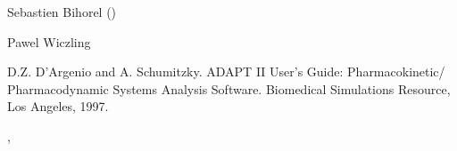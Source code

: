 \begin{Value}
\begin{description}
\begin{description}
\end{description}



\end{description}

\end{Value}
%
\begin{Author}\relax
Sebastien Bihorel ()

Pawel Wiczling
\end{Author}
%
\begin{References}\relax
D.Z. D'Argenio and A. Schumitzky. ADAPT II User's Guide: Pharmacokinetic/
Pharmacodynamic Systems Analysis Software. Biomedical Simulations Resource,
Los Angeles, 1997.
\end{References}
%
\begin{SeeAlso}\relax
{}, 
\end{SeeAlso}
